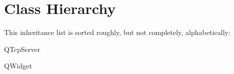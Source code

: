 \section{Class Hierarchy}
This inheritance list is sorted roughly, but not completely, alphabetically\-:\begin{DoxyCompactList}
\item Q\-Tcp\-Server\begin{DoxyCompactList}
\item {}
\end{DoxyCompactList}
\item Q\-Widget\begin{DoxyCompactList}
\item {}
\end{DoxyCompactList}
\end{DoxyCompactList}
